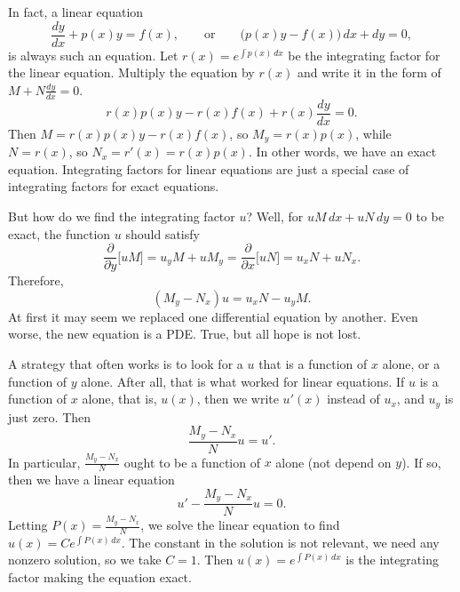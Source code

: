 In fact, a linear equation
\begin{equation*}
\frac{dy}{dx} + p(x) y = f(x), \qquad
\text{or} \qquad
\bigl( p(x) y - f(x) \bigr)\, dx + dy  = 0,
\end{equation*}
is always such an equation.  Let $r(x) = e^{\int p(x)\,dx}$ be the
integrating factor for the linear equation.  Multiply the equation by $r(x)$
and write it in the form of $M + N \frac{dy}{dx} = 0$.
\begin{equation*}
r(x) p(x) y - r(x) f(x) + r(x) \frac{dy}{dx} = 0 .
\end{equation*}
Then $M = r(x) p(x) y - r(x) f(x)$, so
$M_y = r(x) p(x)$, while $N = r(x)$, so
$N_x = r'(x) = r(x) p(x)$.  In other words, we have an exact equation.
Integrating
factors for linear equations are just a special case of integrating
factors for exact equations.

But how do we find the integrating factor $u$?  Well, for
$uM \, dx + uN \, dy = 0$ to be exact,
the function $u$ should satisfy
\begin{equation*}
\frac{\partial}{\partial y} \bigl[ u M \bigr] =
u_y M + u M_y =
\frac{\partial}{\partial x} \bigl[ u N \bigr] =
u_x N + u N_x .
\end{equation*}
Therefore,
\begin{equation*}
(M_y-N_x)u = u_x N - u_y M .
\end{equation*}
At first it may seem we replaced one differential equation by another.
Even worse, the new equation is a PDE\@.
True, but all hope is not lost.

A strategy that often works is to look for a $u$ that is a function
of $x$ alone, or a function of $y$ alone.
After all, that is what worked for linear equations.
If $u$ is a function of $x$
alone,
that is, $u(x)$, then we write $u'(x)$ instead of $u_x$, and $u_y$ is just
zero.
Then
\begin{equation*}
\frac{M_y-N_x}{N}u = u' .
\end{equation*}
In particular, $\frac{M_y-N_x}{N}$ ought to be a function of $x$ alone (not
depend on $y$).  If so, then we have a linear equation
\begin{equation*}
u' - \frac{M_y-N_x}{N} u = 0 .
\end{equation*}
Letting $P(x) = \frac{M_y-N_x}{N}$,
we solve the linear equation
to find $u(x) = C e^{\int P(x) \, dx}$.  The constant in the
solution is not relevant, we need any nonzero solution,
so we take $C=1$.
Then $u(x) = e^{\int P(x) \, dx}$ is the integrating factor
making the equation exact.

